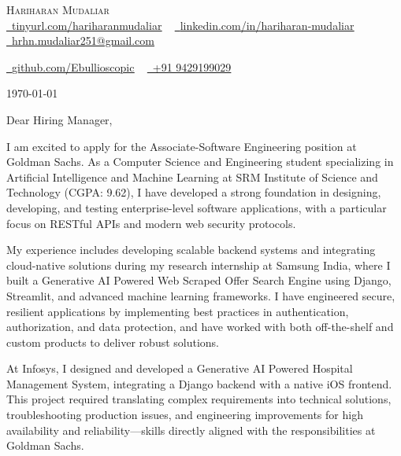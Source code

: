 \documentclass[letterpaper,11pt]{article}
\begin{document}
\begin{center}
    {\Huge \scshape Hariharan Mudaliar} \\ \vspace{1pt}
    \href{https://tinyurl.com/hariharanmudaliar}{\raisebox{-0.2\height}\faLink\ \underline{tinyurl.com/hariharanmudaliar}} ~
    \href{https://linkedin.com/in/hariharan-mudaliar}{\raisebox{-0.2\height}\faLinkedin\ \underline{linkedin.com/in/hariharan-mudaliar}} ~
    \href{mailto:hrhn.mudaliar251@gmail.com}{\raisebox{-0.2\height}\faEnvelope\ \underline{hrhn.mudaliar251@gmail.com}} ~
    
    \href{https://github.com/Ebullioscopic}{\raisebox{-0.2\height}\faGithub\ \underline{github.com/Ebullioscopic}} ~
    \href{tel:+919429199029}{\raisebox{-0.2\height}\faPhone\ +91 9429199029}
\end{center}

\vspace{20pt}

\noindent\today

\vspace{20pt}


\noindent Dear Hiring Manager,

\vspace{10pt}

I am excited to apply for the Associate-Software Engineering position at Goldman Sachs. As a Computer Science and Engineering student specializing in Artificial Intelligence and Machine Learning at SRM Institute of Science and Technology (CGPA: 9.62), I have developed a strong foundation in designing, developing, and testing enterprise-level software applications, with a particular focus on RESTful APIs and modern web security protocols.

My experience includes developing scalable backend systems and integrating cloud-native solutions during my research internship at Samsung India, where I built a Generative AI Powered Web Scraped Offer Search Engine using Django, Streamlit, and advanced machine learning frameworks. I have engineered secure, resilient applications by implementing best practices in authentication, authorization, and data protection, and have worked with both off-the-shelf and custom products to deliver robust solutions.

At Infosys, I designed and developed a Generative AI Powered Hospital Management System, integrating a Django backend with a native iOS frontend. This project required translating complex requirements into technical solutions, troubleshooting production issues, and engineering improvements for high availability and reliability—skills directly aligned with the responsibilities at Goldman Sachs.
\end{document}
